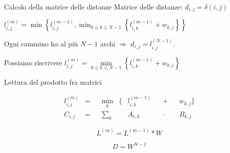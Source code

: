 \documentclass{beamer}
\theoremstyle{plain}
\theoremstyle{definition}
\theoremstyle{remark}
\newcommand{\set}[1]{\left\{#1\right\}}
\begin{document}
\begin{frame}{Calcolo della matrice delle distanze}
  Matrice delle distanze: $d_{i,j} = \delta(i,j)$
  \vfill
  
  $l^{(m)}_{i,j} = \min\set{ l^{(m-1)} _{i,j} , \min _{0\le k\le N-1}
    \set{ l^{(m-1)} _{i,k} + w_{k,j}} }$
  
  Ogni cammino ha al pi\`u $N-1$ archi $\Rightarrow$ $d_{i,j} = l^{(N-1)}
  _{i,j}$.
  \vfill
  
  Possiamo riscrivere $l^{(m)}_{i,j} = \min \limits _{0\le k\le N-1}
  \set{ l^{(m-1)} _{i,k} + w_{k,j}}$
\end{frame}

\begin{frame}{Lettura del prodotto fra matrici}
  \begin{block}{}
    \begin{align*}
      l^{(m)}_{i,j} &=& & \min \limits _k & \Big\{ & l^{(m-1)}
      _{i,k} & & +  & & w_{k,j} \Big\} \\
      C_{i,j} &=& &\sum _k  & &  A_{i,k}  & & \cdot  & &B_{k,j} 
    \end{align*}
  \end{block}
  \pause
  
  \[ L^{(m)} = L^{(m-1)} * W \]

  \begin{block}{}
    \[ D = W^{N-1} \]
  \end{block}
\end{frame}
\end{document}
